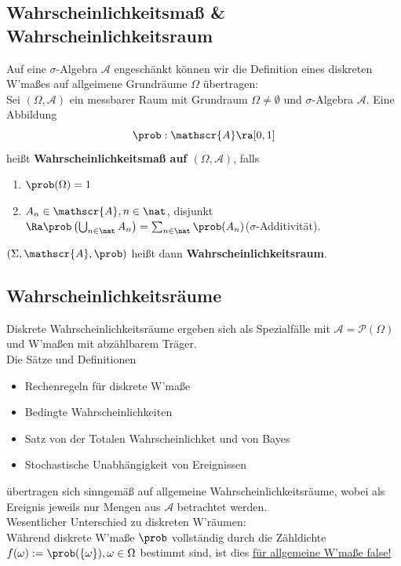 \documentclass{kit}
\begin{document}
  \subsection{Wahrscheinlichkeitsmaß \& Wahrscheinlichkeitsraum}
    Auf eine $\sigma$-Algebra $\mathscr{A}$ engeschänkt können wir die Definition eines diskreten W'maßes auf allgeimene
    Grundräume $\Omega$ übertragen:\\
    Sei $(\Omega,\mathscr{A})$ ein messbarer Raum mit Grundraum $\Omega\neq\emptyset$ und $\sigma$-Algebra $\mathscr{A}$.
    Eine Abbildung
    $$\prob:\mathscr{A}\ra[0,1]$$
    heißt \textbf{Wahrscheinlichkeitsmaß auf $(\Omega,\mathscr{A})$}, falls
    \begin{enumerate}
      \item $\prob(\Omega)=1$
      \item $A_n\in\mathscr{A},n\in\nat$, disjunkt $\Ra\prob\left(\bigcup_{n\in\nat}A_n\right)
        =\sum_{n\in\nat}\prob(A_n)$\hspace{0.5cm}($\sigma$-Additivität).
    \end{enumerate}
    $(\Sigma,\mathscr{A},\prob)$ heißt dann \textbf{Wahrscheinlichkeitsraum}.
  \subsection{Wahrscheinlichkeitsräume}
    Diskrete Wahrscheinlichkeitsräume ergeben sich als Spezialfälle mit $\mathscr{A}=\mathscr{P}(\Omega)$ und W'maßen mit
    abzählbarem Träger.\\
    Die Sätze und Definitionen
    \begin{itemize}
      \item Rechenregeln für diskrete W'maße
      \item Bedingte Wahrscheinlichkeiten
      \item Satz von der Totalen Wahrscheinlichket und von Bayes
      \item Stochastische Unabhängigkeit von Ereignissen
    \end{itemize}
    übertragen sich sinngemäß auf allgemeine Wahrscheinlichkeitsräume, wobei als Ereignis jeweils nur Mengen aus
    $\mathscr{A}$ betrachtet werden.\\
    Wesentlicher Unterschied zu diskreten W'räumen:\\
    Während diskrete W'maße $\prob$ vollständig durch die Zähldichte $f(\omega):=\prob(\{\omega\}),\omega\in\Omega$
    bestimmt sind, ist dies \underline{für allgemeine W'maße false!}
\end{document}

